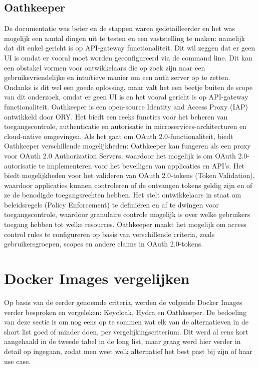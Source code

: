\subsection{Oathkeeper}%
\label{subsec:oathkeeper}
De documentatie was beter en de stappen waren gedetailleerder en het was mogelijk een aantal dingen uit te testen en een vaststelling te maken: namelijk dat dit enkel gericht is op API-gateway functionaliteit. 
Dit wil zeggen dat er geen UI is omdat er vooral moet worden geconfigureerd via de command line. Dit kan een obstakel vormen voor ontwikkelaars die op zoek zijn naar een gebruiksvriendelijke en intuïtieve manier om een auth server op te zetten.
Ondanks is dit wel een goede oplossing, maar valt het een beetje buiten de scope van dit onderzoek, omdat er geen UI is en het vooral gericht is op API-gateway functionaliteit.
\newline
Oathkeeper is een open-source Identity and Access Proxy (IAP) ontwikkeld door ORY. Het biedt een reeks functies voor het beheren van toegangscontrole, authenticatie en autorisatie in microservices-architecturen en cloud-native omgevingen. Als het gaat om OAuth 2.0-functionaliteit, biedt Oathkeeper verschillende mogelijkheden:
Oathkeeper kan fungeren als een proxy voor OAuth 2.0 Authorization Servers, waardoor het mogelijk is om OAuth 2.0-autorisatie te implementeren voor het beveiligen van applicaties en API's.
Het biedt mogelijkheden voor het valideren van OAuth 2.0-tokens (Token Validation), waardoor applicaties kunnen controleren of de ontvangen tokens geldig zijn en of ze de benodigde toegangsrechten hebben.
Het stelt ontwikkelaars in staat om beleidsregels (Policy Enforcement) te definiëren en af te dwingen voor toegangscontrole, waardoor granulaire controle mogelijk is over welke gebruikers toegang hebben tot welke resources.
Oathkeeper maakt het mogelijk om access control rules te configureren op basis van verschillende criteria, zoals gebruikersgroepen, scopes en andere claims in OAuth 2.0-tokens.

\section{Docker Images vergelijken}%
\label{sec:docker-images-vergelijken}
Op basis van de eerder genoemde criteria, werden de volgende Docker Images verder besproken en vergeleken: Keycloak, Hydra en Oathkeeper.
De bedoeling van deze sectie is om nog eens op te sommen wat elk van de alternatieven in de short list goed of minder doen, per vergelijkingscriterium.
Dit werd al eens kort aangehaald in de tweede tabel in de long list, maar graag werd hier verder in detail op ingegaan, zodat men weet welk alternatief
het best past bij zijn of haar use case.

